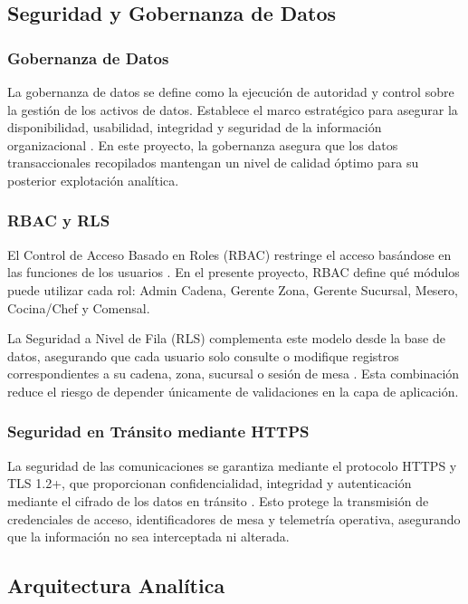 \subsection{Seguridad y Gobernanza de Datos}

\subsubsection{Gobernanza de Datos}

La gobernanza de datos se define como la ejecución de autoridad y control sobre la gestión
de los activos de datos. Establece el marco estratégico para asegurar la disponibilidad,
usabilidad, integridad y seguridad de la información organizacional \cite{dama2017dmbok}.
En este proyecto, la gobernanza asegura que los datos transaccionales recopilados mantengan
un nivel de calidad óptimo para su posterior explotación analítica.

\subsubsection{RBAC y RLS}

El Control de Acceso Basado en Roles (RBAC) restringe el acceso basándose en las funciones
de los usuarios \cite{sandhu1996role}. En el presente proyecto, RBAC define qué módulos
puede utilizar cada rol: Admin Cadena, Gerente Zona, Gerente Sucursal, Mesero, Cocina/Chef
y Comensal.

La Seguridad a Nivel de Fila (RLS) complementa este modelo desde la base de datos, asegurando
que cada usuario solo consulte o modifique registros correspondientes a su cadena, zona,
sucursal o sesión de mesa \cite{postgresql_rls}. Esta combinación reduce el riesgo de
depender únicamente de validaciones en la capa de aplicación.

\subsubsection{Seguridad en Tránsito mediante HTTPS}

La seguridad de las comunicaciones se garantiza mediante el protocolo HTTPS y TLS 1.2+, que
proporcionan confidencialidad, integridad y autenticación mediante el cifrado de los datos
en tránsito \cite{rescorla2018tls}. Esto protege la transmisión de credenciales de acceso,
identificadores de mesa y telemetría operativa, asegurando que la información no sea
interceptada ni alterada.

\subsection{Arquitectura Analítica}

